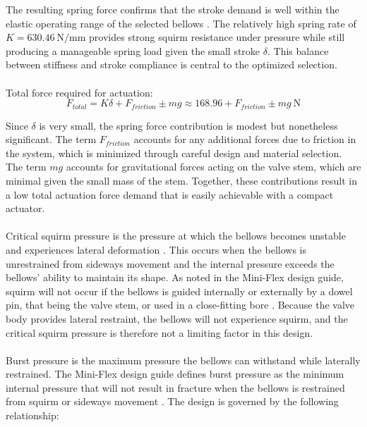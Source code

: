 \documentclass[12pt, letterpaper]{report}%
\begin{document}
            The resulting spring force confirms that the stroke demand is well within the elastic operating 
            range of the selected bellows \cite{miniflex_design}.
            The relatively high spring rate of $K = 630.46\ \text{N/mm}$ provides strong squirm resistance 
            under pressure while still producing a manageable spring load given the small stroke $\delta$.
            This balance between stiffness and stroke compliance is central to the optimized selection.
            \\~\\
            Total force required for actuation:
            \begin{equation}
            F_{total} = K \delta + F_{friction} \pm mg \approx 168.96 + F_{friction} \pm mg \ \text{N}
            \label{force_total}
            \end{equation}

            Since $\delta$ is very small, the spring force contribution is modest but nonetheless significant. 
            The term $F_{friction}$ accounts for any additional forces due to friction in the system, which 
            is minimized through careful design and material selection.
            The term $mg$ accounts for gravitational forces acting on the valve stem, which are minimal given 
            the small mass of the stem.
            Together, these contributions result in a low total actuation force demand that is easily 
            achievable with a compact actuator.
            \\~\\
            Critical squirm pressure is the pressure at which the bellows becomes unstable and experiences 
            lateral deformation \cite{miniflex_design}.
            This occurs when the bellows is unrestrained from sideways movement and the internal pressure 
            exceeds the bellows' ability to maintain its shape.
            As noted in the Mini-Flex design guide, squirm will not occur if the bellows is guided internally 
            or externally by a dowel pin, that being the valve stem, or used in a close-fitting bore \cite{miniflex_design}.
            Because the valve body provides lateral restraint, the bellows will not experience squirm, and 
            the critical squirm pressure is therefore not a limiting factor in this design.
            \\~\\
            Burst pressure is the maximum pressure the bellows can withstand while laterally restrained.
            The Mini-Flex design guide defines burst pressure as the minimum internal pressure that will not 
            result in fracture when the bellows is restrained from squirm or sideways movement \cite{miniflex_design}.
            The design is governed by the following relationship:
\end{document}
